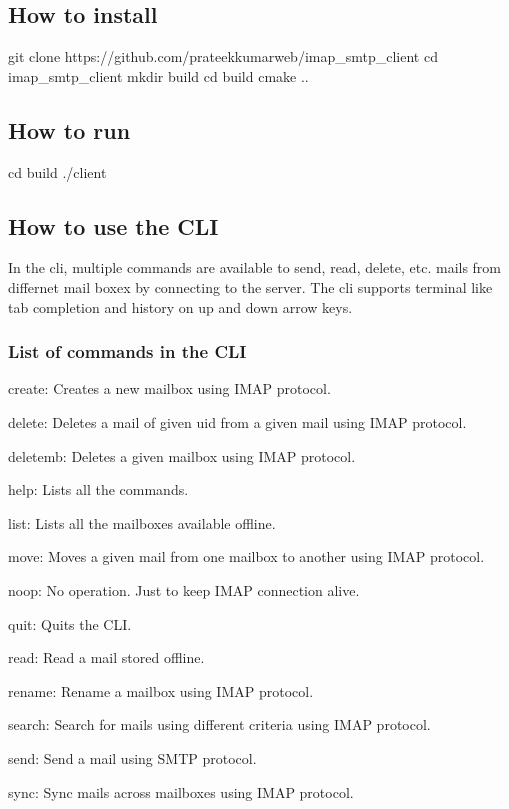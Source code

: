 \subsection*{How to install}


\begin{DoxyCode}
git clone https://github.com/prateekkumarweb/imap\_smtp\_client
cd imap\_smtp\_client
mkdir build
cd build
cmake ..
\end{DoxyCode}


\subsection*{How to run}


\begin{DoxyCode}
cd build
./client
\end{DoxyCode}


\subsection*{How to use the C\+LI}

In the cli, multiple commands are available to send, read, delete, etc. mails from differnet mail boxex by connecting to the server. The cli supports terminal like tab completion and history on up and down arrow keys.

\subsubsection*{List of commands in the C\+LI}


\begin{DoxyEnumerate}
\item {\ttfamily create}\+: Creates a new mailbox using I\+M\+AP protocol.
\item {\ttfamily delete}\+: Deletes a mail of given uid from a given mail using I\+M\+AP protocol.
\item {\ttfamily deletemb}\+: Deletes a given mailbox using I\+M\+AP protocol.
\item {\ttfamily help}\+: Lists all the commands.
\item {\ttfamily list}\+: Lists all the mailboxes available offline.
\item {\ttfamily move}\+: Moves a given mail from one mailbox to another using I\+M\+AP protocol.
\item {\ttfamily noop}\+: No operation. Just to keep I\+M\+AP connection alive.
\item {\ttfamily quit}\+: Quits the C\+LI.
\item {\ttfamily read}\+: Read a mail stored offline.
\item {\ttfamily rename}\+: Rename a mailbox using I\+M\+AP protocol.
\item {\ttfamily search}\+: Search for mails using different criteria using I\+M\+AP protocol.
\item {\ttfamily send}\+: Send a mail using S\+M\+TP protocol.
\item {\ttfamily sync}\+: Sync mails across mailboxes using I\+M\+AP protocol.
\end{DoxyEnumerate}


